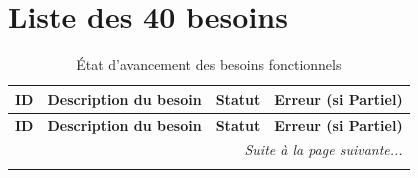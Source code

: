 \documentclass[a4paper]{article}
\begin{document}
\nocite{*}



\appendix

\section{Liste des 40 besoins}

\begin{longtable}{|c|p{7.3cm}|c|p{5.2cm}|}
\caption{État d'avancement des besoins fonctionnels} \label{tab:besoins} \\

\hline 
\textbf{ID} & \textbf{Description du besoin} & \textbf{Statut} & \textbf{Erreur (si Partiel)} \\ \hline
\endfirsthead

\hline
\textbf{ID} & \textbf{Description du besoin} & \textbf{Statut} & \textbf{Erreur (si Partiel)} \\ \hline
\endhead

\hline \multicolumn{4}{r}{\textit{Suite à la page suivante...}} \\
\endfoot

\hline
\endlastfoot


\end{longtable}
\end{document}
